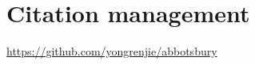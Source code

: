 \section{Citation management}
\label{sec:other__abbotsbury}

\url{https://github.com/yongrenjie/abbotsbury}
